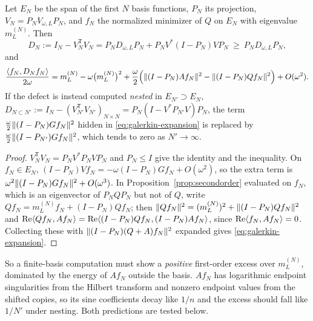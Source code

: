 \begin{proposition}\label{prop:galerkin}
Let $E_N$ be the span of the first $N$ basis functions, $P_N$ its projection,
$V_N=P_NV_{\omega,L}P_N$, and $f_N$ the normalized minimizer of $Q$ on $E_N$
with eigenvalue $m_L^{(N)}$. Then
\begin{equation}\label{eq:galerkin-defect}
 D_N:=I_N-V_N^{\mathsf T}V_N=P_ND_{\omega,L}P_N+P_NV^*(I-P_N)VP_N\ \geq\ P_ND_{\omega,L}P_N ,
\end{equation}
and
\begin{equation}\label{eq:galerkin-expansion}
 \frac{\langle f_N,D_Nf_N\rangle}{2\omega}=m_L^{(N)}-\omega\big(m_L^{(N)}\big)^2
 +\frac\omega2\Big(\lVert (I-P_N)Af_N\rVert^2-\lVert (I-P_N)Qf_N\rVert^2\Big)+O(\omega^2).
\end{equation}
If the defect is instead computed \emph{nested} in $E_{N'}\supset E_N$,
$D_{N\subset N'}:=I_N-(V_{N'}^{\mathsf T}V_{N'})_{N\times N}=P_N(I-V^*P_{N'}V)P_N$,
the term $\frac\omega2\lVert (I-P_N)Gf_N\rVert^2$ hidden in
\eqref{eq:galerkin-expansion} is replaced by $\frac\omega2\lVert (I-P_{N'})Gf_N\rVert^2$,
which tends to zero as $N'\to\infty$.
\end{proposition}
\begin{proof}
$V_N^{\mathsf T}V_N=P_NV^*P_NVP_N$ and $P_N\leq I$ give the identity and the
inequality. On $f_N\in E_N$, $(I-P_N)Vf_N=-\omega(I-P_N)Gf_N+O(\omega^2)$, so the
extra term is $\omega^2\lVert (I-P_N)Gf_N\rVert^2+O(\omega^3)$. In
Proposition~\ref{prop:secondorder} evaluated on $f_N$, which is an eigenvector
of $P_NQP_N$ but not of $Q$, write $Qf_N=m_L^{(N)}f_N+(I-P_N)Qf_N$; then
$\lVert Qf_N\rVert^2=(m_L^{(N)})^2+\lVert (I-P_N)Qf_N\rVert^2$ and
$\operatorname{Re}\langle Qf_N,Af_N\rangle=\operatorname{Re}\langle (I-P_N)Qf_N,(I-P_N)Af_N\rangle$, since $\operatorname{Re}\langle f_N,Af_N\rangle=0$. Collecting these with
$\lVert (I-P_N)(Q+A)f_N\rVert^2$ expanded gives \eqref{eq:galerkin-expansion}.
\end{proof}

So a finite-basis computation must show a \emph{positive} first-order excess
over $m_L^{(N)}$, dominated by the energy of $Af_N$ outside the basis. $Af_N$
has logarithmic endpoint singularities from the Hilbert transform and nonzero
endpoint values from the shifted copies, so its sine coefficients decay like
$1/n$ and the excess should fall like $1/N'$ under nesting. Both predictions
are tested below.

